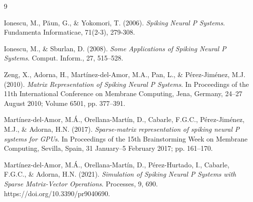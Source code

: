 \documentclass[11pt, a4paper]{article}
\begin{document}
\begin{thebibliography}{9}

Ionescu, M., Păun, G., \& Yokomori, T. (2006).
\textit{Spiking Neural P Systems}.
Fundamenta Informaticae, 71(2-3), 279-308.

Ionescu, M., \& Sburlan, D. (2008).
\textit{Some Applications of Spiking Neural P Systems}.
Comput. Inform., 27, 515–528.

Zeng, X., Adorna, H., Martínez-del-Amor, M.A., Pan, L., \& Pérez-Jiménez, M.J. (2010).
\textit{Matrix Representation of Spiking Neural P Systems}.
In Proceedings of the 11th International Conference on Membrane Computing, Jena, Germany, 24–27 August 2010; Volume 6501, pp. 377–391.

Martínez-del-Amor, M.Á., Orellana-Martín, D., Cabarle, F.G.C., Pérez-Jiménez, M.J., \& Adorna, H.N. (2017).
\textit{Sparse-matrix representation of spiking neural P systems for GPUs}.
In Proceedings of the 15th Brainstorming Week on Membrane Computing, Sevilla, Spain, 31 January–5 February 2017; pp. 161–170.

Martínez-del-Amor, M.Á., Orellana-Martín, D., Pérez-Hurtado, I., Cabarle, F.G.C., \& Adorna, H.N. (2021).
\textit{Simulation of Spiking Neural P Systems with Sparse Matrix-Vector Operations}.
Processes, 9, 690. https://doi.org/10.3390/pr9040690.

\end{thebibliography}
\end{document}
